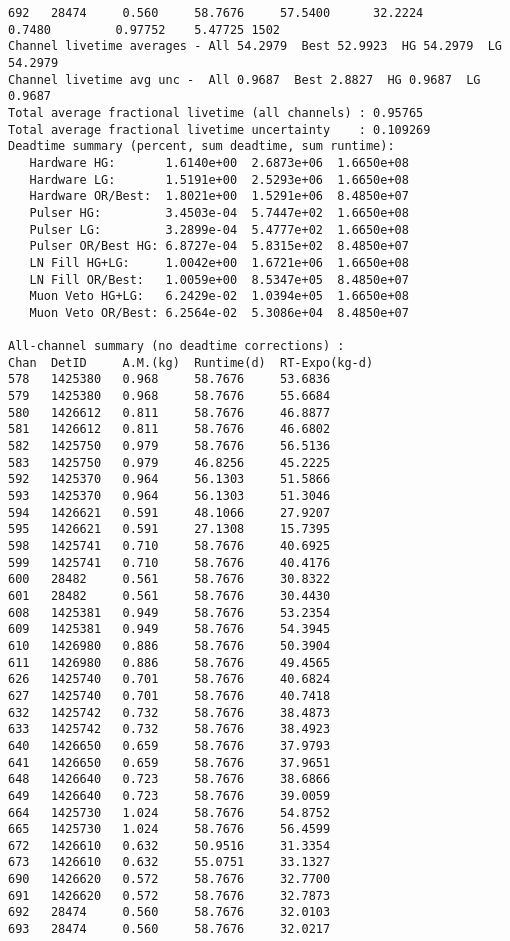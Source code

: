 \documentclass[notitlepage,rmp,aps,10pt]{revtex4-1}
\begin{document}
\begin{verbatim}
692   28474     0.560     58.7676     57.5400      32.2224        0.7480         0.97752    5.47725 1502
Channel livetime averages - All 54.2979  Best 52.9923  HG 54.2979  LG 54.2979
Channel livetime avg unc -  All 0.9687  Best 2.8827  HG 0.9687  LG 0.9687
Total average fractional livetime (all channels) : 0.95765
Total average fractional livetime uncertainty    : 0.109269
Deadtime summary (percent, sum deadtime, sum runtime):
   Hardware HG:       1.6140e+00  2.6873e+06  1.6650e+08
   Hardware LG:       1.5191e+00  2.5293e+06  1.6650e+08
   Hardware OR/Best:  1.8021e+00  1.5291e+06  8.4850e+07
   Pulser HG:         3.4503e-04  5.7447e+02  1.6650e+08
   Pulser LG:         3.2899e-04  5.4777e+02  1.6650e+08
   Pulser OR/Best HG: 6.8727e-04  5.8315e+02  8.4850e+07
   LN Fill HG+LG:     1.0042e+00  1.6721e+06  1.6650e+08
   LN Fill OR/Best:   1.0059e+00  8.5347e+05  8.4850e+07
   Muon Veto HG+LG:   6.2429e-02  1.0394e+05  1.6650e+08
   Muon Veto OR/Best: 6.2564e-02  5.3086e+04  8.4850e+07

All-channel summary (no deadtime corrections) :
Chan  DetID     A.M.(kg)  Runtime(d)  RT-Expo(kg-d)
578   1425380   0.968     58.7676     53.6836
579   1425380   0.968     58.7676     55.6684
580   1426612   0.811     58.7676     46.8877
581   1426612   0.811     58.7676     46.6802
582   1425750   0.979     58.7676     56.5136
583   1425750   0.979     46.8256     45.2225
592   1425370   0.964     56.1303     51.5866
593   1425370   0.964     56.1303     51.3046
594   1426621   0.591     48.1066     27.9207
595   1426621   0.591     27.1308     15.7395
598   1425741   0.710     58.7676     40.6925
599   1425741   0.710     58.7676     40.4176
600   28482     0.561     58.7676     30.8322
601   28482     0.561     58.7676     30.4430
608   1425381   0.949     58.7676     53.2354
609   1425381   0.949     58.7676     54.3945
610   1426980   0.886     58.7676     50.3904
611   1426980   0.886     58.7676     49.4565
626   1425740   0.701     58.7676     40.6824
627   1425740   0.701     58.7676     40.7418
632   1425742   0.732     58.7676     38.4873
633   1425742   0.732     58.7676     38.4923
640   1426650   0.659     58.7676     37.9793
641   1426650   0.659     58.7676     37.9651
648   1426640   0.723     58.7676     38.6866
649   1426640   0.723     58.7676     39.0059
664   1425730   1.024     58.7676     54.8752
665   1425730   1.024     58.7676     56.4599
672   1426610   0.632     50.9516     31.3354
673   1426610   0.632     55.0751     33.1327
690   1426620   0.572     58.7676     32.7700
691   1426620   0.572     58.7676     32.7873
692   28474     0.560     58.7676     32.0103
693   28474     0.560     58.7676     32.0217
\end{verbatim}
\end{document}
